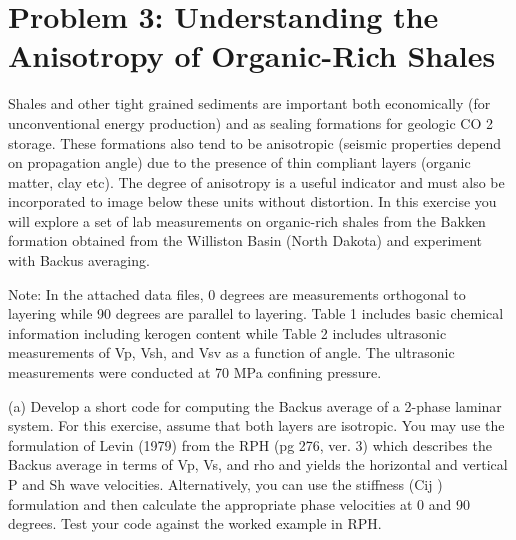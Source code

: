 \section{Problem 3: Understanding the Anisotropy of Organic-Rich Shales}

Shales and other tight grained sediments are important both economically (for unconventional energy production) and as sealing formations for geologic CO 2 storage. These formations also tend to be anisotropic (seismic properties depend on propagation angle) due to the presence of thin compliant layers (organic matter, clay etc). The degree of anisotropy is a useful indicator and must also be incorporated to image below these units without distortion. In this exercise you will explore a set of lab measurements on organic-rich shales from the Bakken formation obtained from the Williston Basin (North Dakota) and experiment with Backus averaging.

Note: In the attached data files, 0 degrees are measurements orthogonal to layering while 90 degrees are parallel to layering. Table 1 includes basic chemical information including kerogen content while Table 2 includes ultrasonic measurements of Vp, Vsh, and Vsv as a function of angle. The ultrasonic measurements were conducted at 70 MPa confining pressure.




\begin{problem}{(a)}
    Develop a short code for computing the Backus average of a 2-phase laminar system. For this exercise, assume that both layers are isotropic. You may use the formulation of Levin (1979) from the RPH (pg 276, ver. 3) which describes the Backus average in terms of Vp, Vs, and rho and yields the horizontal and vertical P and Sh wave velocities. Alternatively, you can use the stiffness (Cij ) formulation and then calculate the appropriate phase velocities at 0 and 90 degrees. Test your code against the worked example in RPH.
\end{problem}

